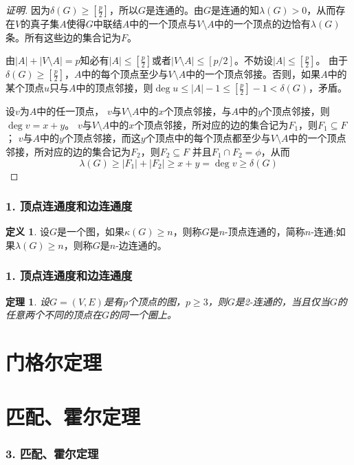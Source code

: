 \documentclass{beamer}
\newtheorem{Thm}{定理}[section]
\theoremstyle{definition}
\newtheorem{Def}{定义}[section]
\theoremstyle{example}
\begin{document}
\begin{CJK}{UTF8}{gbsn}
\begin{frame}
{\begin{proof}[证明]
     

   \pause 因为$\delta(G) \geq [\frac{p}{2}]$，所以$G$是连通的。\pause 由$G$是连通的知$\lambda(G) > 0$，从而存在$V$的真子集$A$使得$G$中联结$A$中的一个顶点与$V\setminus A$中的一个顶点的边恰有$\lambda(G)$条。\pause 所有这些边的集合记为$F$。

  \pause  由$|A| + |V\setminus A| = p$知必有$|A| \leq [\frac{p}{2}]$或者$|V\setminus A| \leq [p/2]$。\pause 不妨设$|A| \leq [\frac{p}{2}]$。 \pause 由于$\delta(G) \geq [\frac{p}{2}]$，$A$中的每个顶点至少与$V\setminus A$中的一个顶点邻接。\pause 否则，如果$A$中的某个顶点$u$只与$A$中的顶点邻接，则$\deg u \leq |A|-1 \leq [\frac{p}{2}] - 1 < \delta(G)$，矛盾。 

\pause    设$v$为$A$中的任一顶点， $v$与$V\setminus A$中的$x$个顶点邻接，与$A$中的$y$个顶点邻接，则$\deg v = x + y$。 \pause $v$与$V\setminus A$中的$x$个顶点邻接，所对应的边的集合记为$F_1$，则$F_1 \subseteq F$；
 \pause    $v$与$A$中的$y$个顶点邻接，而这$y$个顶点中的每个顶点都至少与$V\setminus A$中的一个顶点邻接，所对应的边的集合记为$F_2$，则$F_2 \subseteq F$ 并且$F_1 \cap F_2 = \phi$，\pause 从而
    \[\lambda(G) \geq |F_1| + |F_2| \geq x + y = \deg v \geq  \delta(G)\]
  \end{proof}}
\end{frame}


\begin{frame}
  \frametitle{1. 顶点连通度和边连通度}
  \begin{Def}
    设$G$是一个图，如果$\kappa (G) \geq n$，则称$G$是\alert{$n$-顶点连通}的，简称$n$-连通;如果$\lambda (G) \geq n$，则称$G$是\alert{$n$-边连通}的。
  \end{Def}
\end{frame}

\begin{frame}
  \frametitle{1. 顶点连通度和边连通度}
  \begin{Thm}
    设$G=(V,E)$是有$p$个顶点的图，$p \geq 3$，则$G$是2-连通的，当且仅当$G$的任意两个不同的顶点在$G$的同一个圈上。
  \end{Thm}
\end{frame}

\section{门格尔定理}
\section{匹配、霍尔定理}
\begin{frame}
  \frametitle{3. 匹配、霍尔定理}


\end{frame}
\end{CJK}
\end{document}
